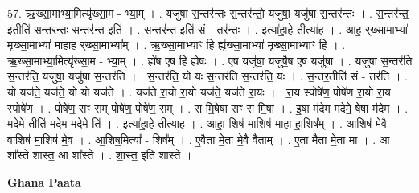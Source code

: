 \documentclass[17pt]{extarticle}
\begin{document}
57. ऋ॒ख्सा॒माभ्या॒मित्यृ॑ख्सा॒म - भ्या॒म् । . यजु॑षा स॒न्तर॑न्तः स॒न्तर॑न्तो॒ यजु॑षा॒ यजु॑षा स॒न्तर॑न्तः । . स॒न्तर॑न्त॒ इतीति॑ स॒न्तर॑न्तः स॒न्तर॑न्त॒ इति॑ । . स॒न्तर॑न्त॒ इति॑ सं - तर॑न्तः । . इत्या॑हा॒हे तीत्या॑ह । . आ॒ह॒ र्‌ख्सा॒माभ्या॑ मृख्सा॒माभ्या॑ माहाह र्‌ख्सा॒माभ्या᳚म् । . ऋ॒ख्सा॒माभ्याꣳ॒॒ हि ह्यृ॑ख्सा॒माभ्या॑ मृख्सा॒माभ्याꣳ॒॒ हि । . ऋ॒ख्सा॒माभ्या॒मित्यृ॑ख्सा॒म - भ्या॒म् । . ह्ये॑ष ए॒ष हि ह्ये॑षः । . ए॒ष यजु॑षा॒ यजु॑षै॒ष ए॒ष यजु॑षा । . यजु॑षा स॒न्तर॑ति स॒न्तर॑ति॒ यजु॑षा॒ यजु॑षा स॒न्तर॑ति । . स॒न्तर॑ति॒ यो यः स॒न्तर॑ति स॒न्तर॑ति॒ यः । . स॒न्तर॒तीति॑ सं - तर॑ति । . यो यज॑ते॒ यज॑ते॒ यो यो यज॑ते । . यज॑ते रा॒यो रा॒यो यज॑ते॒ यज॑ते रा॒यः । . रा॒य स्पोषे॑ण॒ पोषे॑ण रा॒यो रा॒य स्पोषे॑ण । . पोषे॑ण॒ सꣳ सम् पोषे॑ण॒ पोषे॑ण॒ सम् । . स मि॒षेषा सꣳ स मि॒षा । . इ॒षा म॑देम मदेमे॒ षेषा म॑देम । . म॒दे॒मे तीति॑ मदेम मदे॒मे ति॑ । . इत्या॑हा॒हे तीत्या॑ह । . आ॒हा॒ शिष॑ मा॒शिष॑ माहा हा॒शिष᳚म् । . आ॒शिष॑ मे॒वै वाशिष॑ मा॒शिष॑ मे॒व । . आ॒शिष॒मित्या᳚ - शिष᳚म् । . ए॒वैता मे॒ता मे॒वै वैताम् । . ए॒ता मैता मे॒ता मा । . आ शा᳚स्ते शास्त॒ आ शा᳚स्ते । . शा॒स्त॒ इति॑ शास्ते । \newline

\textbf{Ghana Paata } \newline
\end{document}
